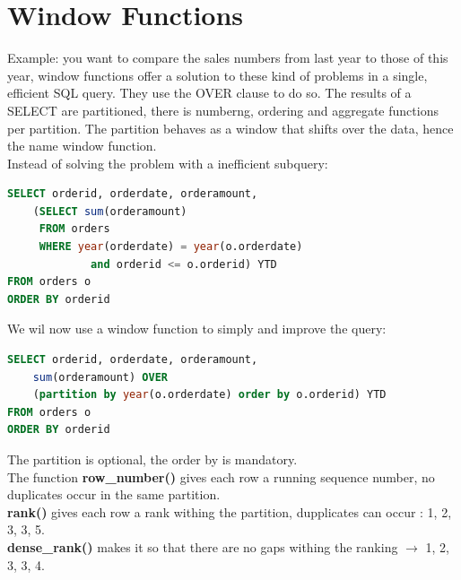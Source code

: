 \documentclass{report}
\begin{document}
	\chapter{Window Functions}
	Example: you want to compare the sales numbers from last year to those of this year, window functions offer a solution to these kind of problems in a single, efficient SQL query. They use the OVER clause to do so. The results of a SELECT are partitioned, there is numberng, ordering and aggregate functions per partition. The partition behaves as a window that shifts over the data, hence the name window function. \\
	Instead of solving the problem with a inefficient subquery: 
	\begin{lstlisting}[language = sql]
SELECT orderid, orderdate, orderamount,
	(SELECT sum(orderamount)
	 FROM orders 
	 WHERE year(orderdate) = year(o.orderdate) 
	 	     and orderid <= o.orderid) YTD
FROM orders o 
ORDER BY orderid	\end{lstlisting}
	We wil now use a window function to simply and improve the query: 
	\begin{lstlisting}[language=sql]
SELECT orderid, orderdate, orderamount,
	sum(orderamount) OVER 
	(partition by year(o.orderdate) order by o.orderid) YTD
FROM orders o
ORDER BY orderid	\end{lstlisting}	
	The partition is optional, the order by is mandatory. \\The function \textbf{row\_number()} gives each row a running sequence number, no duplicates occur in the same partition. \\ \textbf{rank()} gives each row a rank withing the partition, dupplicates can occur : 1, 2, 3, 3, 5.\\ \textbf{dense\_rank()} makes it so that there are no gaps withing the ranking $\longrightarrow$ 1, 2, 3, 3, 4. 
\end{document}
